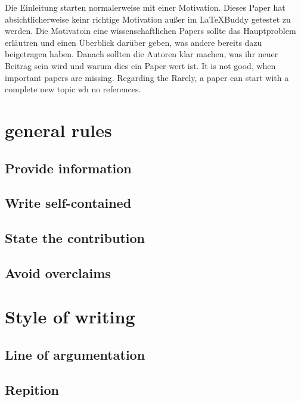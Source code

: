 \documentclass[12pt,a4paper]{article}
\begin{document}
Die Einleitung starten normalerweise mit einer Motivation. Dieses Paper hat absichtlicherweise keinr richtige Motivation außer im \LaTeX{}Buddy getestet zu werden. Die Motivatoin eine wissenschaftlichen Papers sollte das Hauptproblem erläutren und einen Überblick darüber geben, was andere bereits dazu beigetragen haben. Danach sollten die Autoren klar machen, was ihr neuer Beitrag sein wird und warum dies ein Paper wert ist.
It is not good, when important papers are missing. Regarding the Rarely, a paper can start with a complete new topic wh no references. 

\section{general rules}%

\subsection{Provide information}
\subsection{Write self-contained}
\subsection{State the contribution}
\subsection{Avoid overclaims}
\section{Style of writing}
\subsection{Line of argumentation}
\subsection{Repition}
\end{document}
